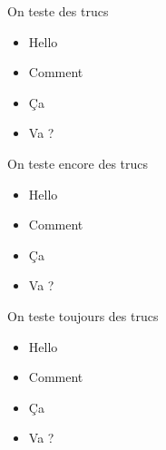 \label{maillage}

\begin{frame}{On teste des trucs}
  \begin{itemize}
    \item<1->Hello
    \item<2->Comment
    \item<3->Ça
    \item<4->Va ?
  \end{itemize}
\end{frame}

\begin{frame}{On teste encore des trucs}
  \begin{itemize}
    \item<1->Hello
    \item<2->Comment
    \item<3->Ça
    \item<4->Va ?
  \end{itemize}
\end{frame}

\begin{frame}{On teste toujours des trucs}
  \begin{itemize}
    \item<1->Hello
    \item<2->Comment
    \item<3->Ça
    \item<4->Va ?
  \end{itemize}
\end{frame}
